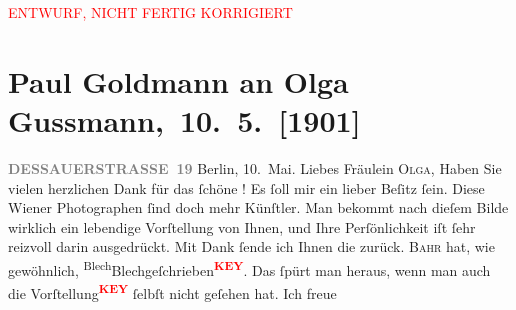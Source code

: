 
\begin{center}
            \textcolor{red}{ENTWURF, NICHT FERTIG KORRIGIERT}
                      \end{center}
            
         
         \renewcommand{\erwaehntePersonen}{Personen: Hermann Bahr, Olga Schnitzler}
         \renewcommand{\erwaehnteOrte}{Orte: Berlin, Dessauer Straße, Wien, Wörthersee}
         \renewcommand{\erwaehnteWerke}{Werke: Neue Freie Presse}
               \section[ Paul Goldmann an Olga Gussmann, 10. 5. {[}1901{]}]{ Paul Goldmann an Olga Gussmann, 10. 5. {[}1901{]}}\nopagebreak{}\rehead{ }\begin{ledgroupsized}[t]{13cm}\normalsize\beginnumbering \toendnotes[C]{\smallbreak\pagebreak[2]} 
\toendnotes[C]{\smallbreak}\pstart
           \noindent{}\raggedleft{}{\pb}\textcolor{gray}{\textbf{DESSAUERSTRASSE 19}}\pend
           \pstart
           Berlin, 10. Mai.\pend
           \pstart\center{}Liebes Fräulein \textsc{Olga},\pend\pstart
           Haben Sie vielen herzlichen Dank für das ſchöne \label{K_L03527-1v}\label{K_L03527-1h}! Es ſoll mir ein lieber Beſitz ſein. Diese Wiener Photographen ſind doch mehr Künſtler. Man bekommt nach
               dieſem Bilde wirklich ein lebendige Vorſtellung von Ihnen, und Ihre Perſönlichkeit
               iſt ſehr reizvoll darin ausgedrückt.\pend
           \pstart
           Mit Dank ſende ich Ihnen die \label{K_L03527-2v}\label{K_L03527-2h} zurück. \textsc{Bahr} hat, {\pb}wie gewöhnlich, \substVorne{}\textsuperscript{Blech}\substDazwischen{}Blech\substHinten{}{ }geſchrieben\textcolor{red}{\textsuperscript{\textbf{KEY}}}. Das ſpürt man heraus, wenn man auch die Vorſtellung\textcolor{red}{\textsuperscript{\textbf{KEY}}} ſelbſt nicht geſehen hat. Ich freue

\end{ledgroupsized}
